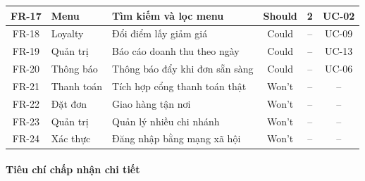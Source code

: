 \begin{longtable}{|c|l|p{5.5cm}|c|c|c|}
FR-17 & Menu & Tìm kiếm và lọc menu & Should & 2 & UC-02 \\ \hline
FR-18 & Loyalty & Đổi điểm lấy giảm giá & Could & -- & UC-09 \\ \hline
FR-19 & Quản trị & Báo cáo doanh thu theo ngày & Could & -- & UC-13 \\ \hline
FR-20 & Thông báo & Thông báo đẩy khi đơn sẵn sàng & Could & -- & UC-06 \\ \hline
FR-21 & Thanh toán & Tích hợp cổng thanh toán thật & Won't & -- & -- \\ \hline
FR-22 & Đặt đơn & Giao hàng tận nơi & Won't & -- & -- \\ \hline
FR-23 & Quản trị & Quản lý nhiều chi nhánh & Won't & -- & -- \\ \hline
FR-24 & Xác thực & Đăng nhập bằng mạng xã hội & Won't & -- & -- \\ \hline
\end{longtable}

\paragraph{Tiêu chí chấp nhận chi tiết}\mbox{}

